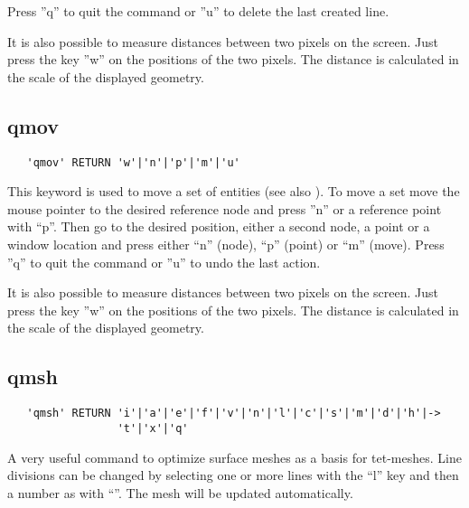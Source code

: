 \documentclass{article}
\begin{document}
Press ''q'' to quit the command or ''u'' to delete the last created line.



It is also possible to measure distances between two pixels on the screen. Just press the key ''w'' on the positions of the two pixels. The distance is calculated in the scale of the displayed geometry.


\subsection{\label{qmov}qmov}
\begin{verbatim}
   'qmov' RETURN 'w'|'n'|'p'|'m'|'u'
\end{verbatim}
This keyword is used to move a set of entities (see also ). To move a set move the mouse pointer to the desired reference node and press ''n'' or a reference point with ``p''. Then go to the desired position, either a second node, a point or a window location and press either ``n'' (node), ``p'' (point) or ``m'' (move). Press ''q'' to quit the command or ''u'' to undo the last action. 

It is also possible to measure distances between two pixels on the screen. Just press the key ''w'' on the positions of the two pixels. The distance is calculated in the scale of the displayed geometry.  


\subsection{\label{qmsh}qmsh}
\begin{verbatim}
   'qmsh' RETURN 'i'|'a'|'e'|'f'|'v'|'n'|'l'|'c'|'s'|'m'|'d'|'h'|->
                 't'|'x'|'q'
\end{verbatim}
A very useful command to optimize surface meshes as a basis for tet-meshes. Line divisions can be changed by selecting one or more lines with the ``l'' key and then a number as with ``''. The mesh will be updated automatically.
\end{document}
